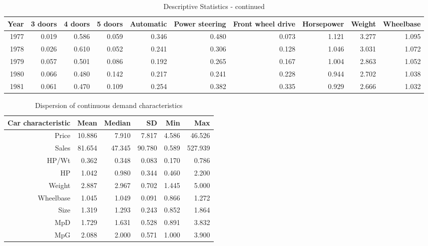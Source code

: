 \documentclass{article}\usepackage[]{graphicx}\usepackage[]{color}
\begin{document}
\begin{table}[ht]
\centering
\caption{Descriptive Statistics - continued} 
\label{tbl:desc_stats2}
\begingroup\footnotesize
\begin{tabular}{rrrrrrrrrr}
  \toprule 
 Year & 3 doors & 4 doors & 5 doors  & Automatic & Power steering & Front wheel drive & Horsepower & Weight & Wheelbase \\
 \midrule 
 1977 & 0.019 & 0.586 & 0.059 & 0.346 & 0.480 & 0.073 & 1.121 & 3.277 & 1.095 \\ 
  1978 & 0.026 & 0.610 & 0.052 & 0.241 & 0.306 & 0.128 & 1.046 & 3.031 & 1.072 \\ 
  1979 & 0.057 & 0.501 & 0.086 & 0.192 & 0.265 & 0.167 & 1.004 & 2.863 & 1.052 \\ 
  1980 & 0.066 & 0.480 & 0.142 & 0.217 & 0.241 & 0.228 & 0.944 & 2.702 & 1.038 \\ 
  1981 & 0.061 & 0.470 & 0.109 & 0.254 & 0.382 & 0.335 & 0.929 & 2.666 & 1.032 \\ 
   \bottomrule 
\end{tabular}
\endgroup
\end{table}



\begin{table}[ht]
\centering
\caption{Dispersion of continuous demand characteristics} 
\label{tbl3:dispersion_char}
\begingroup\footnotesize
\begin{tabular}{rrrrrr}
  \toprule 
 Car characteristic & Mean & Median & SD & Min & Max\\
 \midrule 
 Price & 10.886 & 7.910 & 7.817 & 4.586 & 46.526 \\ 
  Sales & 81.654 & 47.345 & 90.780 & 0.589 & 527.939 \\ 
  HP/Wt & 0.362 & 0.348 & 0.083 & 0.170 & 0.786 \\ 
  HP & 1.042 & 0.980 & 0.344 & 0.460 & 2.200 \\ 
  Weight & 2.887 & 2.967 & 0.702 & 1.445 & 5.000 \\ 
  Wheelbase & 1.045 & 1.049 & 0.091 & 0.866 & 1.272 \\ 
  Size & 1.319 & 1.293 & 0.243 & 0.852 & 1.864 \\ 
  MpD & 1.729 & 1.631 & 0.528 & 0.891 & 3.832 \\ 
  MpG & 2.088 & 2.000 & 0.571 & 1.000 & 3.900 \\ 
   \bottomrule 
\end{tabular}
\endgroup
\end{table}
\end{document}
